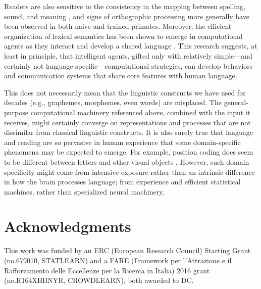 \documentclass[doc,biblatex]{apa7}
\begin{document}
Readers are also sensitive to the consistency in the mapping between spelling, sound, and meaning \parencite{Marelli:2015, Ulicheva:2020}, and signs of orthographic processing more generally have been observed in both naive \parencite{Rajalingham:2018} and trained \parencite{Grainger:2012} primates. Moreover, the efficient organization of lexical semantics has been shown to emerge in computational agents as they interact and develop a shared language \parencite{Chaabouni:2021}. This research suggests, at least in principle, that intelligent agents, gifted only with relatively simple---and certainly not language-specific---computational strategies, can develop behaviors and communication systems that share core features with human language.

This does not necessarily mean that the linguistic constructs we have used for decades (e.g., graphemes, morphemes, even words) are misplaced. The general-purpose computational machinery referenced above, combined with the input it receives, might certainly converge on representations and processes that are not dissimilar from classical linguistic constructs. It is also surely true that language and reading are so pervasive in human experience that some domain-specific phenomena may be expected to emerge. For example, position coding does seem to be different between letters and other visual objects \parencite{Dunabeitia:2012}. However, such domain specificity might come from intensive exposure rather than an intrinsic difference in how the brain processes language; from experience and efficient statistical machines, rather than specialized neural machinery.

\section{Acknowledgments}

This work was funded by an ERC (European Research Council) Starting Grant (no.\@ 679010, STATLEARN) and a FARE (Framework per l'Attrazione e il Rafforzamento delle Eccellenze per la Ricerca in Italia) 2016 grant (no.\@ R164XBHNYR, CROWDLEARN), both awarded to DC.

\printbibliography


\appendix
\renewcommand\thefigure{S\arabic{figure}}
\setcounter{figure}{0}
\renewcommand\thetable{S\arabic{table}}
\setcounter{table}{0}
\end{document}
